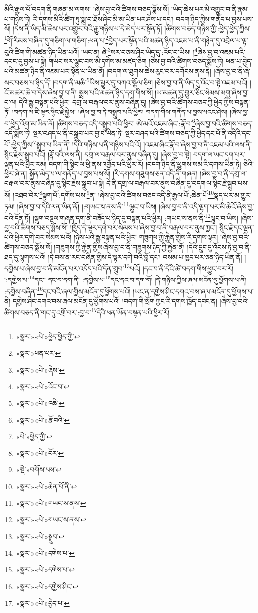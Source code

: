 མིའི་རྒྱལ་པོ་བདག་ནི་གཞན་མ་ལགས། །ཞེས་བྱ་བའི་ཚིགས་བཅད་སྨོས་སོ། །ཡིད་ཆེས་པར་མི་འགྱུར་བ་ནི་རྣམ་པ་གཉིས་ཏེ། རི་དགས་མིའི་ཚིག་ཏུ་སྨྲ་བ་ཐོས་ཤིང་མི་མ་ཡིན་པར་ཤེས་པ་དང་། བདག་ཉིད་ཀྱིས་གནོད་པ་བྱས་པས་སོ། །དེས་ནི་ཡིད་མི་ཆེས་པར་འགྱུར་བའི་རྒྱུ་གཉིས་པ་དེ་མེད་པར་སྟོན་ཏོ། །ཚིགས་བཅད་གཉིས་ཀྱི་:ཕྱེད་ཕྱེད་ཀྱིས་\footnote{«སྣར་»«པེ་»ཕྱེད་ཕྱེད་ཀྱི་}གོ་རིམས་བཞིན་དུ་གཅིག་ལ་གཅིག་:ཕན་པ་\footnote{«སྣར་»ཕན་པར་}བྱེད་པར་སྟོན་པའི་མཚན་ཉིད་འཇམ་པ་ནི་གཉེན་དུ་འབྲེལ་པ་ལྟ་བུའི་ཚིག་གི་མཚན་ཉིད་ཡིན་པའོ། །ཡང་ན། ཞེ་\footnote{«སྣར་»«པེ་»ཞེས་}སར་བཅས་ཤིང་ཡིད་དུ་:འོང་བ་ཡིས། །\footnote{«སྣར་»«པེ་»འོང་བ་}ཞེས་བྱ་བ་འཇམ་པའི་དབང་དུ་བྱས་པ་སྟེ། གཡང་སར་ལྷུང་བས་མི་དགེས་མ་མཛད་ཅིག །ཅེས་བྱ་བའི་ཚིགས་བཅད་སྨོས་ཏེ། ཕན་པ་བྱེད་པའི་མཚན་ཉིད་ནི་འཇམ་པར་སྟོན་པ་ཡིན་ནོ། །བདག་ལ་ཐུགས་ཆེས་རུང་བར་དགོངས་ནས་ནི། །ཞེས་བྱ་བ་ནི་ཞེ་སར་བཅས་པ་ཉིད་དོ། །བདག་ནི་མཆི་\footnote{«སྣར་»«པེ་»འཆི་}ཡིས་མྱུར་དུ་བཀའ་སྩོལ་ཅིག །ཅེས་བྱ་བ་ནི་ཡིད་དུ་འོང་བ་སྟེ་འཇམ་པའོ། །ངོ་མཚར་ཆེ་བ་དེས་ཞེས་བྱ་བ་ནི། སྨྲས་པའི་མཚན་ཉིད་དག་གིས་སོ། །ཡ་མཚན་དུ་གྱུར་ཅིང་སེམས་མགུ་ཞེས་བྱ་བ་ལ། དེའི་རྒྱུ་བསྟན་པའི་ཕྱིར། དགྲ་ལ་བརྒལ་བར་ནུས་བཞིན་དུ། །ཞེས་བྱ་བའི་ཚིགས་བཅད་ཀྱི་ཕྱེད་ཀྱིས་བསྟན་ཏོ། །བདག་ལ་ཇི་ལྟར་སྙིང་རྗེ་སྐྱེས། །ཞེས་བྱ་བ་དེ་བསྒྲུབ་པའི་ཕྱིར། བདག་གིས་གནོད་པ་བྱས་པའང་ཤེས། །ཞེས་བྱ་བ་ཕྱེད་འོག་མ་ཡིན་ནོ། །ཚིགས་བཅད་འདི་བསྒྲུབ་པའི་ཕྱིར། ཨེ་མའོ་འཇམ་ཞིང་:རྣོ་བ་\footnote{«སྣར་»«པེ་»རྣོ་བའི་}ཞེས་བྱ་བའི་ཚིགས་བཅད་འདི་སྨོས་ཏེ། སྔར་བཤད་པ་ནི་བསྒྲུབ་པར་བྱ་བ་ཡིན་ཏེ། སྔར་བཤད་པའི་ཚིགས་བཅད་ཀྱི་ཕྱེད་དང་པོ་ནི་འདིའི་དང་པོ་:ཕྱེད་ཀྱིས་\footnote{«པེ་»ཕྱེད་ཀྱི་}སྒྲུབ་པ་ཡིན་ནོ། །དེའི་གཉིས་པ་ནི་གཉིས་པའི་འོ། །འཇམ་ཞིང་རྣོ་བ་ཞེས་བྱ་བ་ནི་འཇམ་པའི་ལས་ནི་སྙིང་རྗེས་སྒྲུབ་པའོ། །རྣོ་བའི་ལས་ནི། དགྲ་ལ་བརྒལ་བར་ནུས་བཞིན་དུ། །ཞེས་བྱ་བ་སྟེ། བདག་ལ་ཡང་དག་པར་ལྡན་པའི་ཕྱིར་རམ། བདག་གི་སྙིང་ལ་ཕྱི་ནས་འགྱོད་པའི་ཕྱིར་རོ། །བདག་ཉིད་ནི་ཕྱུགས་སམ་རི་དགས་ཡིན་ཏེ། ཅིའི་ཕྱིར་ཞེ་ན། སྐྱོན་མེད་པ་ལ་གནོད་པ་བྱས་པས་སོ། །རི་དགས་གཟུགས་ཅན་འདི་ནི་གཞན། །ཞེས་བྱ་བ་ནི་དགྲ་ལ་བརྒལ་བར་ནུས་བཞིན་དུ་སྙིང་རྗེས་སྒྲུབ་པ་སྟེ། དེ་ནི་དགྲ་ལ་བརྒལ་བར་ནུས་བཞིན་དུ་བདག་ལ་སྙིང་རྗེ་སྒྲུབ་པས་སོ། །འཐབ་བེར་\footnote{«སྣར་»«པེ་»བོར་}སྟུག་པོ་:དགོས་པས་\footnote{«སྡེ་»བགོས་པས་}ན། །ཞེས་བྱ་བའི་ཚིགས་བཅད་འདི་ནི་རྒྱལ་པོ་:ཆེན་པོ་\footnote{«སྣར་»«པེ་»ཆེན་པོ་ནི་}སྣད་པར་མ་གྱུར་ཏམ། །ཞེས་བྱ་བ་དེའི་ལན་ཡིན་ནོ། །:གཡང་ས་ནས་ནི་\footnote{«སྣར་»«པེ་»གཡང་ས་ནས་}ལྷུང་བ་ཡིས། །ཞེས་བྱ་བ་ནི་འདི་ལྷག་པར་མི་ཆེའོ་ཞེས་བྱ་བའི་དོན་ཏོ། །སྡུག་བསྔལ་གཞན་དག་ནི་བཟོད་པ་ཉིད་དུ་བསྟན་པའི་ཕྱིར། :གཡང་ས་ནས་ནི་\footnote{«སྣར་»«པེ་»གཡང་ས་ནས་}ལྷུང་བ་ཡིས། །ཞེས་བྱ་བའི་ཚིགས་བཅད་སྨོས་སོ། །ཁྱོད་དེ་ལྟར་དགེ་བར་སེམས་པ་ཞེས་བྱ་བ་ནི་བརྒལ་བར་ནུས་ཀྱང་། སྙིང་རྗེ་དང་ལྡན་པའི་ཕྱིར་དགེ་བར་སེམས་པའོ། །ཉེས་པའི་རྒྱུ་བསྟན་པའི་ཕྱིར། གཟུགས་ཀྱི་རྐྱེན་གྱིས་རི་དགས་ལྟར། །ཞེས་བྱ་བའི་ཚིགས་བཅད་སྨོས་སོ། །གཟུགས་ཀྱི་རྐྱེན་གྱིས་ཞེས་བྱ་བ་ནི་གཟུགས་ཉིད་ཀྱི་རྐྱེན་ནོ། །དེའི་དྲུང་དུ་འོངས་ཏེ་བྱ་བ་ནི་ཐད་དུ་ལྷགས་པའོ། །དེ་བས་ན་རང་བཞིན་གྱིས་དེ་ལྟར་དགེ་བའི་བློ་དང་། བསམ་པ་ཁྱད་པར་ཅན་ཉིད་ཡིན་ནོ། །དགྱེས་པ་ཞེས་བྱ་བ་ནི་མངོན་པར་འདོད་པའི་དོན་གྲུབ་\footnote{«སྣར་»«པེ་»སྒྲུབ་}པའོ། །དང་བ་ནི་དེའི་ཚེ་བདག་གིས་ཕྱུང་བར་རོ། །:དགྱེས་པ་\footnote{«སྣར་»«པེ་»དགེས་པ་}དང་། དང་བ་དག་ནི། :དགྱེས་པ་\footnote{«སྣར་»«པེ་»དགེས་པ་}དང་དང་བ་དག་གོ། །དེ་གཉིས་ཀྱིས་ཞལ་མངོན་དུ་ཕྱོགས་པ་ནི། :དགྱེས་བཞིན་\footnote{«སྣར་»«པེ་»དགྱེས་ཤིང་}དང་བའི་ཞལ་གྱིས་མངོན་དུ་ཕྱོགས་པའོ། །ཡང་ན་དགྱེས་ཤིང་དགའ་བས་ཞལ་མངོན་དུ་ཕྱོགས་པ་ནི། དགྱེས་ཤིང་དགའ་བས་ཞལ་མངོན་དུ་ཕྱོགས་པའོ། །བདག་གི་སྲོག་ཀྱང་རི་དགས་ཁྱོད་དབང་ན། །ཞེས་བྱ་བའི་ཚིགས་བཅད་ནི་གང་དུ་འགྲོ་བར་:བྱ་བ་\footnote{«སྣར་»«པེ་»བྱེད་པ་}དེའི་ཕན་ཡོན་བསྟན་པའི་ཕྱིར་རོ། 